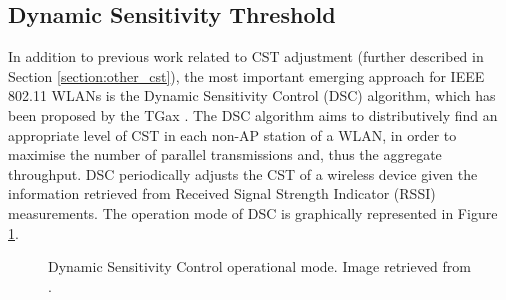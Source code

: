 \documentclass[12pt, a4paper,twoside]{tesi_upf}
\begin{document}
			\subsection{Dynamic Sensitivity Threshold}
			\label{section:dsc}		
				In addition to previous work related to CST adjustment (further described in Section \ref{section:other_cst}), the most important emerging approach for IEEE 802.11 WLANs is the Dynamic Sensitivity Control (DSC) algorithm, which has been proposed by the TGax \cite{smith2015dynamic}. The DSC algorithm aims to distributively find an appropriate level of CST in each non-AP station of a WLAN, in order to maximise the number of parallel transmissions and, thus the aggregate throughput. DSC periodically adjusts the CST of a wireless device given the information retrieved from Received Signal Strength Indicator (RSSI) measurements. The operation mode of DSC is graphically represented in Figure \ref{fig:dsc_flowchart}.				
				\begin{figure}[t!]
					\centering
					\caption{Dynamic Sensitivity Control operational mode. Image retrieved from \cite{afaqui2015evaluation}.}
					\label{fig:dsc_flowchart}
				\end{figure}
			
\end{document}
